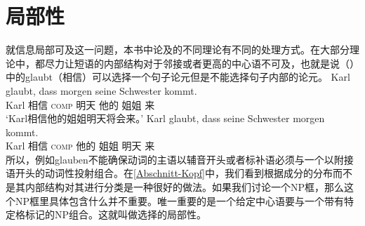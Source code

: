 
\section{局部性}
\label{Abschnitt-Diskussion-Lokalitaet}\label{sec-locality}

就信息局部可及这一问题，本书中论及的不同理论有不同的处理方式。在大部分理论中，都尽力让短语的内部结构对于邻接或者更高的中心语不可及，也就是说（）中的glaubt（相信）可以选择一个句子论元但是不能选择句子内部的论元。
\eal
\ex 
\gll Karl glaubt, dass morgen seine Schwester kommt.\\
	 Karl 相信 \textsc{comp} 明天 他的 姐姐 来\\
\glt `Karl相信他的姐姐明天将会来。'
\ex 
\gll Karl glaubt, dass seine Schwester morgen kommt.\\
	 Karl 相信 \textsc{comp} 他的 姐姐 明天 来\\
\zl
所以，例如glauben不能确保动词的主语以辅音开头或者标补语必须与一个以附接语开头的动词性投射组合。在\ref{Abschnitt-Kopf}中，我们看到根据成分的分布而不是其内部结构对其进行分类是一种很好的做法。如果我们讨论一个NP框，那么这个NP框里具体包含什么并不重要。唯一重要的是一个给定中心语要与一个带有特定格标记的NP组合。这就叫做选择的局部性。

